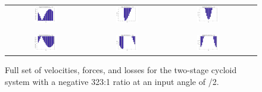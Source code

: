\begin{figure}[h]
   \centering
   \begin{tabular}{cccc}
	   \includegraphics[width=0.30\textwidth]{fig/double_1_neg_vel_pi_2} &
	   \includegraphics[width=0.30\textwidth]{fig/double_1_neg_forces_pi_2} &
	   \includegraphics[width=0.30\textwidth]{fig/double_1_neg_losses_pi_2} \\
	   \\
	   \hline
	   \\
	   \includegraphics[width=0.30\textwidth]{fig/double_2_neg_vel_pi_2} &
	   \includegraphics[width=0.30\textwidth]{fig/double_2_neg_forces_pi_2} &
	   \includegraphics[width=0.30\textwidth]{fig/double_2_neg_losses_pi_2} \\
   \end{tabular}
   \caption{Full set of velocities, forces, and losses for the two-stage cycloid system with a negative 323:1 ratio at an input angle of \textpi/2.}
   \label{fig:two_stage_forces_neg}
\end{figure}

